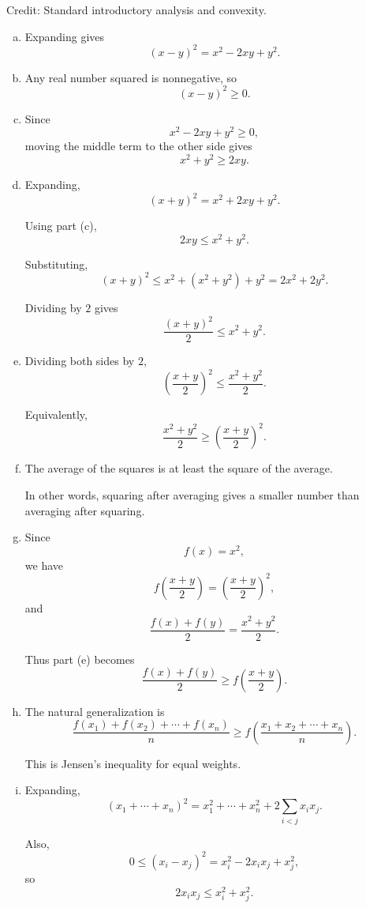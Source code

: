 \documentclass[12pt]{article}
\begin{document}
Credit: Standard introductory analysis and convexity.

\begin{enumerate}[(a)]

\item Expanding gives
\[
(x-y)^2=x^2-2xy+y^2.
\]

\item Any real number squared is nonnegative, so
\[
(x-y)^2\geq 0.
\]

\item Since
\[
x^2-2xy+y^2\geq 0,
\]
moving the middle term to the other side gives
\[
x^2+y^2\geq 2xy.
\]

\item Expanding,
\[
(x+y)^2=x^2+2xy+y^2.
\]

Using part (c),
\[
2xy\leq x^2+y^2.
\]

Substituting,
\[
(x+y)^2
\leq
x^2+(x^2+y^2)+y^2
=
2x^2+2y^2.
\]

Dividing by $2$ gives
\[
\frac{(x+y)^2}{2}
\leq
x^2+y^2.
\]

\item Dividing both sides by $2$,
\[
\left(\frac{x+y}{2}\right)^2
\leq
\frac{x^2+y^2}{2}.
\]

Equivalently,
\[
\frac{x^2+y^2}{2}
\geq
\left(\frac{x+y}{2}\right)^2.
\]

\item The average of the squares is at least the square of the average.

In other words,
squaring after averaging gives a smaller number than averaging after squaring.

\item Since
\[
f(x)=x^2,
\]
we have
\[
f\left(\frac{x+y}{2}\right)
=
\left(\frac{x+y}{2}\right)^2,
\]
and
\[
\frac{f(x)+f(y)}{2}
=
\frac{x^2+y^2}{2}.
\]

Thus part (e) becomes
\[
\frac{f(x)+f(y)}{2}
\geq
f\left(\frac{x+y}{2}\right).
\]

\item The natural generalization is
\[
\frac{f(x_1)+f(x_2)+\cdots+f(x_n)}{n}
\geq
f\left(
\frac{x_1+x_2+\cdots+x_n}{n}
\right).
\]

This is Jensen's inequality for equal weights.

\item Expanding,
\[
(x_1+\cdots+x_n)^2
=
x_1^2+\cdots+x_n^2
+
2\sum_{i<j}x_ix_j.
\]

Also,
\[
0\leq (x_i-x_j)^2=x_i^2-2x_ix_j+x_j^2,
\]
so
\[
2x_ix_j\leq x_i^2+x_j^2.
\]


\end{enumerate}
\end{document}

